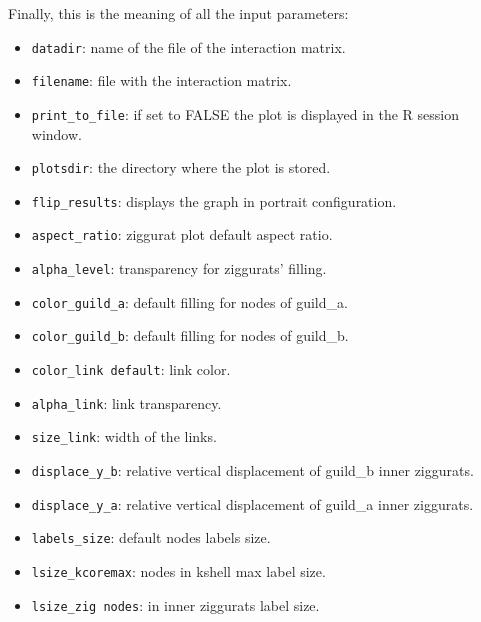 \documentclass[11pt]{article}
\begin{document}
\noindent Finally, this is the meaning of all the input parameters:
\small
\begin{itemize}

\item \texttt{datadir}:  name of the file of the interaction matrix.

\item \texttt{filename}: file with the interaction matrix.

\item \texttt{print\_to\_file}: if set to FALSE the plot is displayed in the R session window.

\item \texttt{plotsdir}:  the directory where the plot is stored.

\item \texttt{flip\_results}: displays the graph in portrait configuration.

\item \texttt{aspect\_ratio}: ziggurat plot default aspect ratio.

\item \texttt{alpha\_level}: transparency for ziggurats' filling.

\item \texttt{color\_guild\_a}: default filling for nodes of guild\_a.

\item \texttt{color\_guild\_b}: default filling for nodes of guild\_b.

\item \texttt{color\_link default}: link color.

\item \texttt{alpha\_link}: link transparency.

\item \texttt{size\_link}: width of the links.
\item \texttt{displace\_y\_b}: relative vertical displacement of guild\_b inner ziggurats.

\item \texttt{displace\_y\_a}: relative vertical displacement of guild\_a inner ziggurats.

\item \texttt{labels\_size}: default nodes labels size.

\item \texttt{lsize\_kcoremax}: nodes in kshell max label size.

\item \texttt{lsize\_zig nodes}: in inner ziggurats label size.


\end{itemize}
\end{document}
